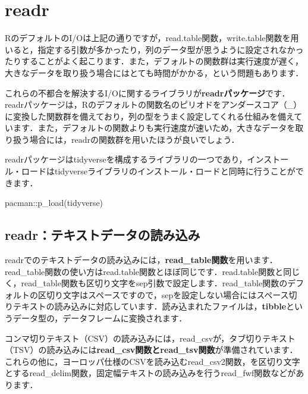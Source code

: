 \documentclass[
  letterpaper,
  DIV=11,
  numbers=noendperiod]{scrreprt}
\newenvironment{Shaded}{\begin{snugshade}}{\end{snugshade}}
\newcommand{\FunctionTok}[1]{\textcolor[rgb]{0.28,0.35,0.67}{#1}}
\newcommand{\NormalTok}[1]{\textcolor[rgb]{0.00,0.23,0.31}{#1}}
\newcommand{\SpecialCharTok}[1]{\textcolor[rgb]{0.37,0.37,0.37}{#1}}
\begin{document}
\hypertarget{readr}{%
\section{readr}\label{readr}}

RのデフォルトのI/Oは上記の通りですが，read.table関数，write.table関数を用いると，指定する引数が多かったり，列のデータ型が思うように設定されなかったりすることがよく起こります．また，デフォルトの関数群は実行速度が遅く，大きなデータを取り扱う場合にはとても時間がかかる，という問題もあります．

これらの不都合を解決するI/Oに関するライブラリが\textbf{readrパッケージ}です．readrパッケージは，Rのデフォルトの関数名のピリオドをアンダースコア（\_）に変換した関数群を備えており，列の型をうまく設定してくれる仕組みを備えています．また，デフォルトの関数よりも実行速度が速いため，大きなデータを取り扱う場合には，readrの関数群を用いたほうが良いでしょう．

readrパッケージはtidyverseを構成するライブラリの一つであり，インストール・ロードはtidyverseライブラリのインストール・ロードと同時に行うことができます．

\begin{Shaded}
\begin{Highlighting}[]
\NormalTok{pacman}\SpecialCharTok{::}\FunctionTok{p\_load}\NormalTok{(tidyverse)}
\end{Highlighting}
\end{Shaded}

\hypertarget{readrux30c6ux30adux30b9ux30c8ux30c7ux30fcux30bfux306eux8aadux307fux8fbcux307f}{%
\subsection{readr：テキストデータの読み込み}\label{readrux30c6ux30adux30b9ux30c8ux30c7ux30fcux30bfux306eux8aadux307fux8fbcux307f}}

readrでのテキストデータの読み込みには，\textbf{read\_table関数}を用います．read\_table関数の使い方はread.table関数とほぼ同じです．read.table関数と同じく，read\_table関数も区切り文字をsep引数で設定します．read\_table関数のデフォルトの区切り文字はスペースですので，sepを設定しない場合にはスペース切りテキストの読み込みに対応しています．読み込まれたファイルは，\textbf{tibble}というデータ型の，データフレームに変換されます．

コンマ切りテキスト（CSV）の読み込みには，read\_csvが，タブ切りテキスト（TSV）の読み込みには\textbf{read\_csv関数とread\_tsv関数}が準備されています．これらの他に，ヨーロッパ仕様のCSVを読み込むread\_csv2関数，\textbar を区切り文字とするread\_delim関数，固定幅テキストの読み込みを行うread\_fwf関数などがあります．
\end{document}
